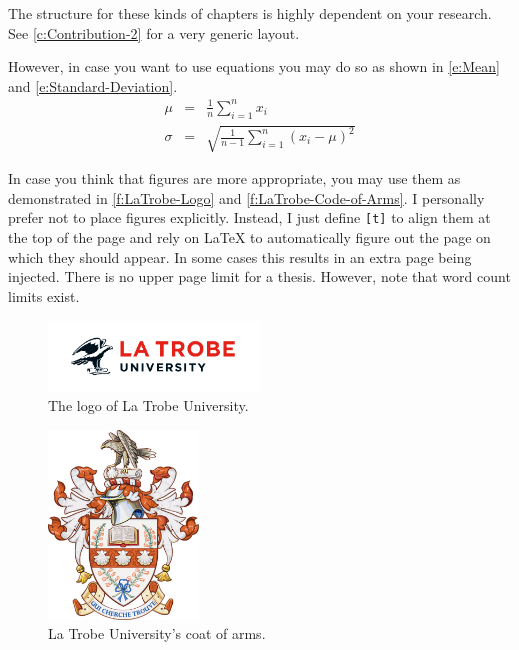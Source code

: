 
The structure for these kinds of chapters is highly dependent on your research. See \autoref{c:Contribution-2} for a very generic layout.

However, in case you want to use equations you may do so as shown in \autoref{e:Mean} and \autoref{e:Standard-Deviation}.
\begin{eqnarray}
\mu    &=& \frac{1}{n} \sum_{i=1}^{n} x_i
\label{e:Mean} \\
\sigma &=& \sqrt{\frac{1}{n - 1} \sum_{i=1}^{n} (x_i - \mu)^2}
\label{e:Standard-Deviation}
\end{eqnarray}

In case you think that figures are more appropriate, you may use them as demonstrated in \autoref{f:LaTrobe-Logo} and \autoref{f:LaTrobe-Code-of-Arms}. I personally prefer not to place figures explicitly. Instead, I just define \texttt{[t]} to align them at the top of the page and rely on \LaTeX{} to automatically figure out the page on which they should appear. In some cases this results in an extra page being injected. There is no upper page limit for a thesis. However, note that word count limits exist.

\begin{figure}[t]
\centering
\includegraphics[width=0.5\textwidth]{figures/latrobe-logo}
\caption{The logo of La Trobe University.}
\label{f:LaTrobe-Logo}
\end{figure}

\begin{figure}[t]
\centering
\includegraphics[width=4cm]{figures/latrobe-coat-of-arms}
\caption{La Trobe University's coat of arms.}
\label{f:LaTrobe-Code-of-Arms}
\end{figure}

